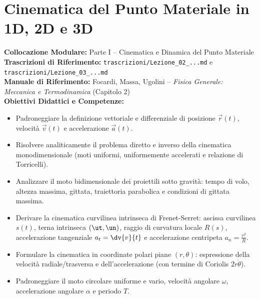 \chapter{Cinematica del Punto Materiale in 1D, 2D e 3D}
\label{chap:cinematica_punto}

\begin{tcolorbox}[enhanced, breakable, colback=navyblue!4!white, colframe=navyblue!80!black,
    coltitle=white, fonttitle=\bfseries\sffamily, title={Quadro Sinottico del Capitolo 02 (Corrispondenza: Lezioni 02 e 03)},
    sharp corners, rounded corners=south, boxrule=1pt]
\textbf{Collocazione Modulare:} Parte I -- Cinematica e Dinamica del Punto Materiale\\
\textbf{Trascrizioni di Riferimento:} \texttt{trascrizioni/Lezione\_02\_...md} e \texttt{trascrizioni/Lezione\_03\_...md}\\
\textbf{Manuale di Riferimento:} Focardi, Massa, Ugolini -- \emph{Fisica Generale: Meccanica e Termodinamica} (Capitolo 2)\\
\textbf{Obiettivi Didattici e Competenze:}\par
\begin{itemize}
    \item Padroneggiare la definizione vettoriale e differenziale di posizione $\vec{r}(t)$, velocità $\vec{v}(t)$ e accelerazione $\vec{a}(t)$.
    \item Risolvere analiticamente il problema diretto e inverso della cinematica monodimensionale (moti uniformi, uniformemente accelerati e relazione di Torricelli).
    \item Analizzare il moto bidimensionale dei proiettili sotto gravità: tempo di volo, altezza massima, gittata, traiettoria parabolica e condizioni di gittata massima.
    \item Derivare la cinematica curvilinea intrinseca di Frenet-Serret: ascissa curvilinea $s(t)$, terna intrinseca $(\ut, \un)$, raggio di curvatura locale $R(s)$, accelerazione tangenziale $a_t = \dv{v}{t}$ e accelerazione centripeta $a_n = \frac{v^2}{R}$.
    \item Formulare la cinematica in coordinate polari piane $(r, \theta)$: espressione della velocità radiale/trasversa e dell'accelerazione (con termine di Coriolis $2\dot{r}\dot{\theta}$).
    \item Padroneggiare il moto circolare uniforme e vario, velocità angolare $\omega$, accelerazione angolare $\alpha$ e periodo $T$.
\end{itemize}
\end{tcolorbox}

